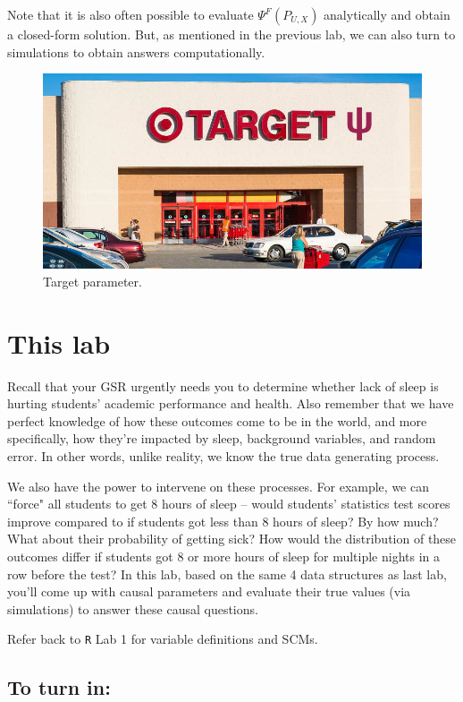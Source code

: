 \documentclass[answers]{exam}
\begin{document}
\noindent Note that it is also often possible to evaluate $\Psi^F(P_{U,X})$ analytically and obtain a closed-form solution. But, as mentioned in the previous lab, we can also turn to simulations to obtain answers computationally.


\begin{figure}
\begin{center}
\includegraphics[width=.5\textwidth]{target2.jpg}
\caption{Target parameter.}
\end{center}
\end{figure}

\section{This lab}

Recall that your GSR urgently needs you to determine whether lack of sleep is hurting students' academic performance and health. Also remember that we have perfect knowledge of how these outcomes come to be in the world, and more specifically, how they're impacted by sleep, background variables, and random error. In other words, unlike reality, we know the true data generating process.

\noindent We also have the power to intervene on these processes. For example, we can ``force" all students to get 8 hours of sleep -- would students' statistics test scores improve compared to if students got less than 8 hours of sleep? By how much? What about their probability of getting sick? How would the distribution of these outcomes differ if students got 8 or more hours of sleep for multiple nights in a row before the test? In this lab, based on the same 4 data structures as last lab, you'll come up with causal parameters and evaluate their true values (via simulations) to answer these causal questions.

\noindent Refer back to \texttt{R} Lab 1 for variable definitions and SCMs.



\subsection{To turn in:}
\end{document}
